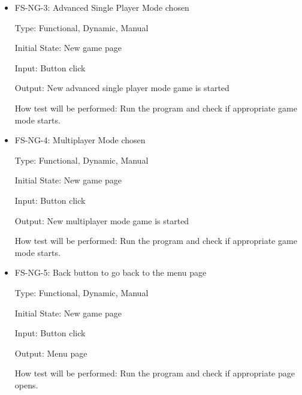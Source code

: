 \documentclass[12pt,letterpaper]{article}
\begin{document}
\begin{reqbox}
	\begin{itemize}
	\item FS-NG-3: Advanced Single Player Mode chosen

	Type: Functional, Dynamic, Manual

	Initial State: New game page

	Input: Button click

	Output: New advanced single player mode game is started

	How test will be performed: Run the program and check if appropriate game mode starts.
	\end{itemize}
\end{reqbox}

\begin{reqbox}
	\begin{itemize}
	\item FS-NG-4: Multiplayer Mode chosen

	Type: Functional, Dynamic, Manual

	Initial State: New game page

	Input: Button click

	Output: New multiplayer mode game is started

	How test will be performed: Run the program and check if appropriate game mode starts.
	\end{itemize}
\end{reqbox}

\begin{reqbox}
	\begin{itemize}
	\item FS-NG-5: Back button to go back to the menu page

	Type: Functional, Dynamic, Manual

	Initial State: New game page

	Input: Button click

	Output: Menu page

	How test will be performed: Run the program and check if appropriate page opens.
	\end{itemize}
\end{reqbox}
\end{document}
